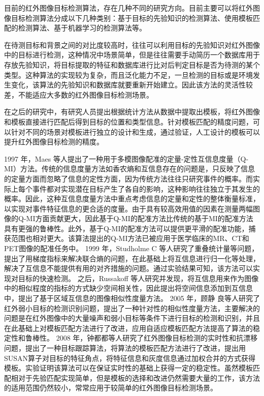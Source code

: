 目前的红外图像目标检测算法，存在几种不同的研究方向。目前主要可以将红外图像目标检测算法分成以下几种类别：基于目标的先验知识的检测算法、使用模板匹配的检测算法、基于机器学习的检测算法等。

在待测目标和背景之间的对比度较高时，往往可以利用目标的先验知识对红外图像中的目标进行检测，这种情况中场景简单，但是往往需要手动简历一个数据库用于存放先验知识，将目标提取的特征和数据库进行比对后判定目标是否为待测的某个类型。这种算法的实现较为复杂，而且泛化能力不足，一旦检测的目标或是环境发生变化，该算法的先验知识和数据库就要重新开始建立。因此该方法的灵活性较差，不能适应大多数的红外图像目标检测场景。

在之后的研究中，有研究人员提出根据统计方法从数据中提取出模板，将红外图像和模板直接进行匹配后得到目标的位置和类型信息\cite{宋曦2010一种基于模板匹配的目标识别方法}。针对模板匹配的精度问题，可以针对不同的场景对模板进行独立的设计和生成，通过验证，人工设计的模板可以提升红外图像目标检测的精度。

1997 年，Maes 等人提出了一种用于多模图像配准的定量-定性互信息度量\cite{maes1997multimodality}（Q-MI）方法。传统的信息度量方法如香农熵和互信息存在的问题是，只反映了信息的定量方面而忽略了信息的定性方面，因为传统方法往往只研究事件的概率。而实际上每个事件都对实现潜在目标产生了各自的影响，这种影响往往独立于其发生的概率。因此，这种互信息度量方法中重点考虑信息的定量和定性的整体衡量标准，以实现对事件特征信息的更合适的度量。由于具有较高效用值的因素在测量两幅图像的Q-MI方面贡献更大，因此基于Q-MI的配准方法比传统的基于MI的配准方法具有更强的鲁棒性。此外，基于Q-MI的配准方法可以提供更平滑的配准功能，捕获范围也相对更大。该算法提出的Q-MI方法已被应用于医学临床的MR、CT和PET图像的配准任务中。
1999 年，Studholme C 等人研究了重叠统计量等问题\cite{studholme1999overlap}，提出了用梯度指标来解决联合熵的问题，在此基础上将互信息进行归一化等处理，解决了互信息不能提供有用的对齐措施的问题。通过实验结果可知，该方法可以实现对目标的快速检测。
之后，Russakoff 等人研究并发现，将互信息用来作为图像中的相似程度的指标的方式缺少空间相关性，因此提出将空间信息添加到互信息中，提出了基于区域互信息的图像相似性度量方法\cite{russakoff2004image}。
2005 年，顾静
良等人研究了红外弱小目标的检测识别问题，提出了一种针对性的相似性度量方法，主要解决的问题是在红外图像中的大量噪声和弱小目标等条件下进行目标的检测和识别，并且在此基础上对模板匹配方法进行了改进，应用自适应模板匹配方法提高了算法的稳定性和鲁棒性\cite{顾静良2005基于自适应模板匹配的红外弱小目标检测}。
2008 年，钟都都等人研究了红外图像目标检测的实时性和抗漂移问题\cite{钟都都2008用于红外目标跟踪的模板匹配改进算法}，提出了一种目标跟踪算法，将算法的模板匹配方法进行了改进，提出用SUSAN算子对目标的特征角点，将特征信息和灰度信息通过加权合并的方式获得模板。实验证明该算法可以在保证实时性的基础上获得一定的稳定性。虽然模板匹配相对于先验匹配实现简单，但是模板的选择和改进仍然需要大量的工作，该方法的适用范围仍然较小，常常应用于较简单的红外图像目标检测场景。

